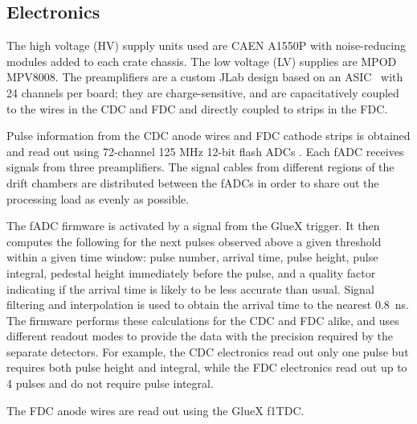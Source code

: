 \subsection{Electronics \label{sec:dcelectronics}}
The high voltage (HV) supply units used are CAEN A1550P with noise-reducing modules added to each crate chassis. 
The low voltage (LV) supplies are MPOD MPV8008. 
The preamplifiers are a custom JLab design based on an ASIC~\cite{hdnote2515}
with 24 channels per board; they are charge-sensitive, and are capacitatively coupled to the wires in the CDC and FDC and directly coupled to strips in the FDC. 

Pulse information from the CDC anode wires and FDC cathode strips is obtained and read out using 72-channel 125 MHz 12-bit flash ADCs \cite{Visser2008,5873864}. 
Each fADC receives signals from three preamplifiers. 
The signal cables from different regions of the drift chambers are distributed between the fADCs in order to share out the processing load as evenly as possible.  

The fADC firmware is activated by a signal from the GlueX trigger. It then computes the following for the next pulses observed above a given threshold within a given time window: pulse number, arrival time, pulse height, pulse integral, pedestal height immediately before the pulse, and a quality factor indicating if the arrival time is likely to be less accurate than usual. 
Signal filtering and interpolation is used to obtain the arrival time to the nearest 0.8~ns. 
The firmware performs these calculations for the CDC and FDC alike, and uses different readout modes to provide the data with the precision required by the separate detectors. 
For example, the CDC electronics read out only one pulse but requires both pulse height and integral, while the FDC electronics read out up to 4 pulses and do not require pulse integral.  


The FDC anode wires are read out using the GlueX f1TDC\cite{JLAB2002}. 



